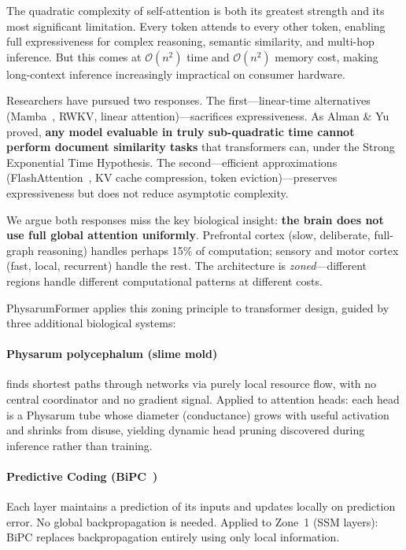 \documentclass[11pt]{article}
\begin{document}
The quadratic complexity of self-attention is both its greatest strength and its most significant limitation. Every token attends to every other token, enabling full expressiveness for complex reasoning, semantic similarity, and multi-hop inference. But this comes at $\mathcal{O}(n^2)$ time and $\mathcal{O}(n^2)$ memory cost, making long-context inference increasingly impractical on consumer hardware.

Researchers have pursued two responses. The first---linear-time alternatives (Mamba~\cite{gu2023mamba}, RWKV, linear attention)---sacrifices expressiveness. As Alman \& Yu~\cite{alman2025limitations} proved, \textbf{any model evaluable in truly sub-quadratic time cannot perform document similarity tasks} that transformers can, under the Strong Exponential Time Hypothesis. The second---efficient approximations (FlashAttention~\cite{dao2024flashattention}, KV cache compression, token eviction)---preserves expressiveness but does not reduce asymptotic complexity.

We argue both responses miss the key biological insight: \textbf{the brain does not use full global attention uniformly}. Prefrontal cortex (slow, deliberate, full-graph reasoning) handles perhaps 15\% of computation; sensory and motor cortex (fast, local, recurrent) handle the rest. The architecture is \emph{zoned}---different regions handle different computational patterns at different costs.

PhysarumFormer applies this zoning principle to transformer design, guided by three additional biological systems:

\paragraph{Physarum polycephalum (slime mold)} finds shortest paths through networks via purely local resource flow, with no central coordinator and no gradient signal. Applied to attention heads: each head is a Physarum tube whose diameter (conductance) grows with useful activation and shrinks from disuse, yielding dynamic head pruning discovered during inference rather than training.

\paragraph{Predictive Coding (BiPC~\cite{bipc2025})} Each layer maintains a prediction of its inputs and updates locally on prediction error. No global backpropagation is needed. Applied to Zone~1 (SSM layers): BiPC replaces backpropagation entirely using only local information.
\end{document}
